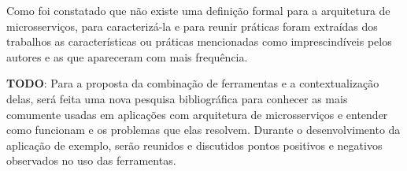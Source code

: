 Como foi constatado que não existe uma definição formal para a arquitetura de microsserviços, para caracterizá-la e para reunir práticas foram extraídas dos trabalhos as características ou práticas mencionadas como imprescindíveis pelos autores e as que apareceram com mais frequência. 

\textbf{TODO}: Para a proposta da combinação de ferramentas e a contextualização delas, será feita uma nova pesquisa bibliográfica para conhecer as mais comumente usadas em aplicações com arquitetura de microsserviços e entender como funcionam e os problemas que elas resolvem. Durante o desenvolvimento da aplicação de exemplo, serão reunidos e discutidos pontos positivos e negativos observados no uso das ferramentas.  


